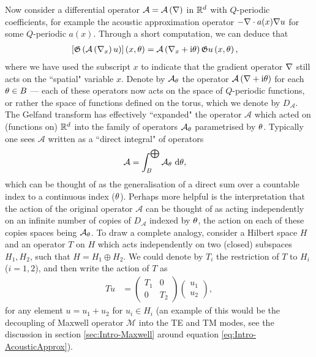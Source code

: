 Now consider a differential operator $\mathcal{A} = \mathcal{A}\left( \nabla \right)$ in $\mathbb{R}^d$ with $Q$-periodic coefficients, for example the acoustic approximation operator $-\nabla\cdot a(x)\nabla u$ for some $Q$-periodic $a(x)$.
Through a short computation, we can deduce that
\begin{align*}
	\left[ \mathfrak{G}\left( \mathcal{A}\left( \nabla_x \right)u \right) \right](x,\theta) 
	&= \mathcal{A}\left( \nabla_x + \mathrm{i}\theta \right)\mathfrak{G} u\left( x,\theta \right),
\end{align*}
where we have used the subscript $x$ to indicate that the gradient operator $\nabla$ still acts on the ``spatial" variable $x$.
Denote by $\mathcal{A}_{\theta}$ the operator $\mathcal{A}\left( \nabla+\mathrm{i}\theta \right)$ for each $\theta\in B$ --- each of these operators now acts on the space of $Q$-periodic functions, or rather the space of functions defined on the torus, which we denote by $D_{\mathcal{A}}$.
The Gelfand transform has effectively ``expanded" the operator $\mathcal{A}$ which acted on (functions on) $\mathbb{R}^d$ into the family of operators $\mathcal{A}_{\theta}$ parametrised by $\theta$.
Typically one sees $\mathcal{A}$ written as a ``direct integral" of operators
\begin{align*}
	\mathcal{A} &= \int_{B}^{\bigoplus}\mathcal{A}_{\theta} \ \mathrm{d}\theta,
\end{align*}
 which can be thought of as the generalisation of a direct sum over a countable index to a continuous index ($\theta$).
Perhaps more helpful is the interpretation that the action of the original operator $\mathcal{A}$ can be thought of as acting independently on an infinite number of copies of $D_{\mathcal{A}}$ indexed by $\theta$, the action on each of these copies spaces being $\mathcal{A}_{\theta}$.
To draw a complete analogy, consider a Hilbert space $H$ and an operator $T$ on $H$ which acts independently on two (closed) subspaces $H_1, H_2$, such that $H = H_1 \oplus H_2$.
We could denote by $T_i$ the restriction of $T$ to $H_i$ ($i=1,2$), and then write the action of $T$ as
\begin{align*}
	Tu &= \begin{pmatrix} T_1 & 0 \\ 0 & T_2 \end{pmatrix}
	\begin{pmatrix} u_1 \\ u_2	\end{pmatrix},
\end{align*}
for any element $u = u_1 + u_2$ for $u_i\in H_i$ (an example of this would be the decoupling of Maxwell operator $\mathcal{M}$ into the TE and TM modes, see the discussion in section \ref{sec:Intro-Maxwell} around equation \eqref{eq:Intro-AcousticApprox}).
